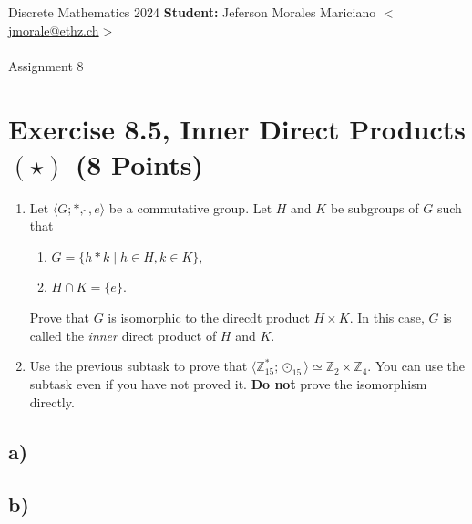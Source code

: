 \documentclass[unicode,11pt,a4paper,oneside,numbers=endperiod,openany]{scrartcl}
\def\Z{\mathbb{Z}}
\begin{document}
\setassignment
{}

\serieheader
{Discrete Mathematics}
{2024}
{%
\textbf{Student:} Jeferson Morales Mariciano 
\href{mailto:jmorale@ethz.ch}{\(<\)jmorale@ethz.ch\(>\)} \\\\}
{\vspace{-1cm}}%
{Assignment 8}{}

\section*{Exercise 8.5, Inner Direct Products \( (\star) \) \hfill (8 Points)}

\begin{enumerate}[label=\textbf{\alph*)}]
    \item 
    Let \( \langle G; \ast, \widehat{\ }, e \rangle \) be a commutative group.
    Let \( H \) and \( K \) be subgroups of \( G \) such that

    \begin{enumerate}[label=(\roman*)]
        \item \( G = \{ h \ast k \mid h \in H, k \in K \} \),
        \item \( H \cap K = \{ e \} \).
    \end{enumerate}
    
    Prove that \( G \) is isomorphic to the direcdt product \( H \times K \).
    In this case, \( G \) is called the \textit{inner} direct product of \( H \) and \( K \).

    \item 
    Use the previous subtask to prove that 
    \( \langle \Z^{\ast}_{15}; \odot_{15} \rangle \simeq \Z_2 \times \Z_4 \).
    You can use the subtask even if you have not proved it.
    \textbf{Do not} prove the isomorphism directly.
\end{enumerate}

\subsection*{a)}


\subsection*{b)}
\end{document}
